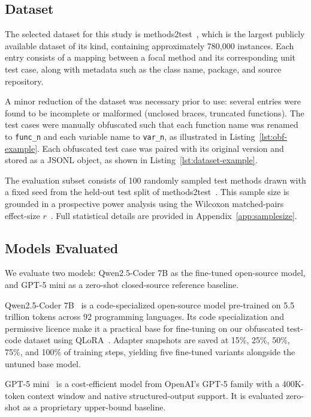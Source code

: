 \documentclass[conference]{IEEEtran}
\begin{document}
\subsection{Dataset}

The selected dataset for this study is methods2test~\cite{tufano2022methods2test},
which is the largest publicly available dataset of its kind, containing
approximately 780,000 instances.
Each entry consists of a mapping between a focal method and its corresponding
unit test case, along with metadata such as the class name, package, and source
repository.

A minor reduction of the dataset was necessary prior to use: several entries
were found to be incomplete or malformed (unclosed braces, truncated functions).
The test cases were manually obfuscated such that each function name was renamed
to \texttt{func\_n} and each variable name to \texttt{var\_n}, as illustrated
in Listing~\ref{lst:obf-example}.
Each obfuscated test case was paired with its original version and stored as a
JSONL object, as shown in Listing~\ref{lst:dataset-example}.

The evaluation subset consists of 100 randomly sampled test methods drawn with
a fixed seed from the held-out test split of
methods2test~\cite{tufano2022methods2test}.
This sample size is grounded in a prospective power analysis using the Wilcoxon
matched-pairs effect-size $r$~\cite{cohen1988statistical,arcuri2011practical}.
Full statistical details are provided in Appendix~\ref{app:samplesize}.

\subsection{Models Evaluated}

We evaluate two models: Qwen2.5-Coder 7B as the fine-tuned open-source model,
and GPT-5 mini as a zero-shot closed-source reference baseline.

Qwen2.5-Coder 7B~\cite{hui2024qwen25coder} is a code-specialized open-source
model pre-trained on 5.5 trillion tokens across 92 programming languages.
Its code specialization and permissive licence make it a practical base for
fine-tuning on our obfuscated test-code dataset using QLoRA~\cite{dettmers2023qlora}.
Adapter snapshots are saved at 15\%, 25\%, 50\%, 75\%, and 100\% of training
steps, yielding five fine-tuned variants alongside the untuned base model.

GPT-5 mini~\cite{openai2025gpt5} is a cost-efficient model from OpenAI's GPT-5
family with a 400K-token context window and native structured-output support.
It is evaluated zero-shot as a proprietary upper-bound baseline.
\end{document}
